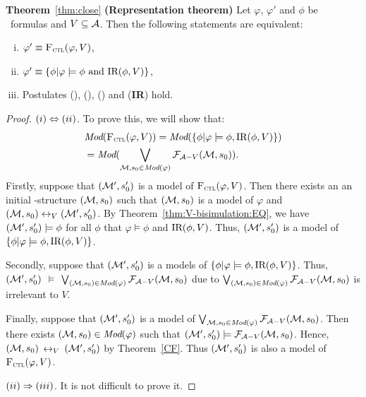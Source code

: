 \documentclass{article}
\begin{document}
\textbf{Theorem}~\ref{thm:close}
\textbf{(Representation theorem)}
Let $\varphi$, $\varphi'$ and $\phi$ be \CTL\ formulas and $V \subseteq {\cal A}$.
Then the following statements are equivalent:
\begin{enumerate}[(i)]
  \item $\varphi' \equiv {\textsc{F}_{\textsc{ctl}}}(\varphi, V)$,
  \item $\varphi'\equiv \{\phi | \varphi \models \phi \text{ and } \textrm{IR}(\phi, V)\}$,
  \item Postulates (\W), (\PP), (\NgP) and (\textbf{IR}) hold.
\end{enumerate}
\begin{proof}
$(i) \Leftrightarrow (ii)$. To prove this, we will show that:
\begin{align*}
 & \textit{Mod}({\textsc{F}_{\textsc{ctl}}}(\varphi, V)) = \textit{Mod}(\{\phi | \varphi \models \phi, \textrm{IR}(\phi, V)\})\\
 & = \textit{Mod}(\bigvee_{{\cal M}, s_0\in \textit{Mod}(\varphi)} {\cal F}_{{\cal A}- V}({\cal M}, s_0)).
\end{align*}
Firstly, suppose that $({\cal M}', s_0')$ is a model of ${\textsc{F}_{\textsc{ctl}}}(\varphi, V)$. Then there exists an  an initial \MPK-structure $({\cal M}, s_0)$ such that $({\cal M}, s_0)$ is a model of $\varphi$ and $({\cal M}, s_0) \leftrightarrow_V ({\cal M}', s_0')$. By Theorem~\ref{thm:V-bisimulation:EQ}, we have $({\cal M}', s_0') \models \phi$ for all $\phi$ that $\varphi\models \phi$ and $\textrm{IR}(\phi, V)$. Thus, $({\cal M}', s_0')$ is a model of $\{\phi | \varphi \models \phi, \textrm{IR}(\phi, V)\}$.

Secondly, suppose that $({\cal M}', s_0')$ is a models of $\{\phi | \varphi \models \phi, \textrm{IR}(\phi, V)\}$. Thus, $({\cal M}', s_0')$ $\models$ $\bigvee_{({\cal M}, s_0)\in \textit{Mod}(\varphi)} {\cal F}_{{\cal A}- V}({\cal M}, s_0)$ due to $\bigvee_{({\cal M}, s_0)\in \textit{Mod}(\varphi)} {\cal F}_{{\cal A}- V}({\cal M}, s_0)$ is irrelevant to $V$.

Finally, suppose that $({\cal M}', s_0')$ is a model of $\bigvee_{{\cal M}, s_0\in \textit{Mod}(\varphi)} {\cal F}_{{\cal A}- V}({\cal M}, s_0)$. Then there exists $({\cal M}, s_0) \in \textit{Mod}(\varphi)$ such that $({\cal M}', s_0') \models {\cal F}_{{\cal A}- V}({\cal M}, s_0)$. Hence, $({\cal M}, s_0)$ $\leftrightarrow_V$ $({\cal M}', s_0')$ by Theorem~\ref{CF}. Thus $({\cal M}', s_0')$ is also a model of ${\textsc{F}_{\textsc{ctl}}}(\varphi,V)$.


$(ii)\Rightarrow (iii)$. It is not difficult to prove it.


\end{proof}
\end{document}
